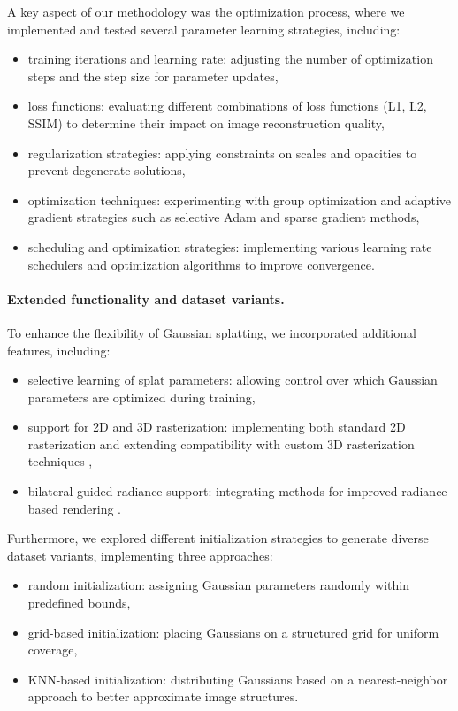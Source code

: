 A key aspect of our methodology was the optimization process, where we implemented and tested several parameter learning strategies, including:

\begin{itemize}
    \item training iterations and learning rate: adjusting the number of optimization steps and the step size for parameter updates,
    \item loss functions: evaluating different combinations of loss functions (L1, L2, SSIM) to determine their impact on image reconstruction quality,
    \item regularization strategies: applying constraints on scales and opacities to prevent degenerate solutions,
    \item optimization techniques: experimenting with group optimization and adaptive gradient strategies such as selective Adam and sparse gradient methods,
    \item scheduling and optimization strategies: implementing various learning rate schedulers and optimization algorithms to improve convergence.
\end{itemize}

\paragraph{Extended functionality and dataset variants.}
To enhance the flexibility of Gaussian splatting, we incorporated additional features, including:

\begin{itemize}
    \item selective learning of splat parameters: allowing control over which Gaussian parameters are optimized during training,
    \item support for 2D and 3D rasterization: implementing both standard 2D rasterization and extending compatibility with custom 3D rasterization techniques \cite{kerbl20233dgs},
    \item bilateral guided radiance support: integrating methods for improved radiance-based rendering \cite{wang2024bilateralgr}.
\end{itemize}

Furthermore, we explored different initialization strategies to generate diverse dataset variants, implementing three approaches:

\begin{itemize}
    \item random initialization: assigning Gaussian parameters randomly within predefined bounds,
    \item grid-based initialization: placing Gaussians on a structured grid for uniform coverage,
    \item KNN-based initialization: distributing Gaussians based on a nearest-neighbor approach to better approximate image structures.
\end{itemize}

